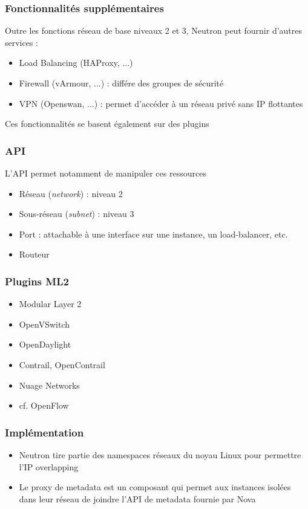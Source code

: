   \begin{frame}
    \frametitle{Fonctionnalités supplémentaires}
    Outre les fonctions réseau de base niveaux 2 et 3, Neutron peut fournir d'autres services :
    \begin{itemize}
      \item Load Balancing (HAProxy, ...)
      \item Firewall (vArmour, ...) : différe des groupes de sécurité
      \item VPN (Openswan, ...) : permet d'accéder à un réseau privé sans IP flottantes
    \end{itemize}
    Ces fonctionnalités se basent également sur des plugins
  \end{frame}

  \begin{frame}
    \frametitle{API}
    L'API permet notamment de manipuler ces ressources
    \begin{itemize}
      \item Réseau (\textit{network}) : niveau 2
      \item Sous-réseau (\textit{subnet}) : niveau 3
      \item Port : attachable à une interface sur une instance, un load-balancer, etc.
      \item Routeur
    \end{itemize}
  \end{frame}

  \begin{frame}
    \frametitle{Plugins ML2}
    \begin{itemize}
      \item Modular Layer 2
      \item OpenVSwitch
      \item OpenDaylight
      \item Contrail, OpenContrail
      \item Nuage Networks
      \item cf. OpenFlow
    \end{itemize}
  \end{frame}

  \begin{frame}
    \frametitle{Implémentation}
    \begin{itemize}
      \item Neutron tire partie des namespaces réseaux du noyau Linux pour permettre l'IP overlapping
      \item Le proxy de metadata est un composant qui permet aux instances isolées dans leur réseau de joindre l'API de metadata fournie par Nova
    \end{itemize}
  \end{frame}

